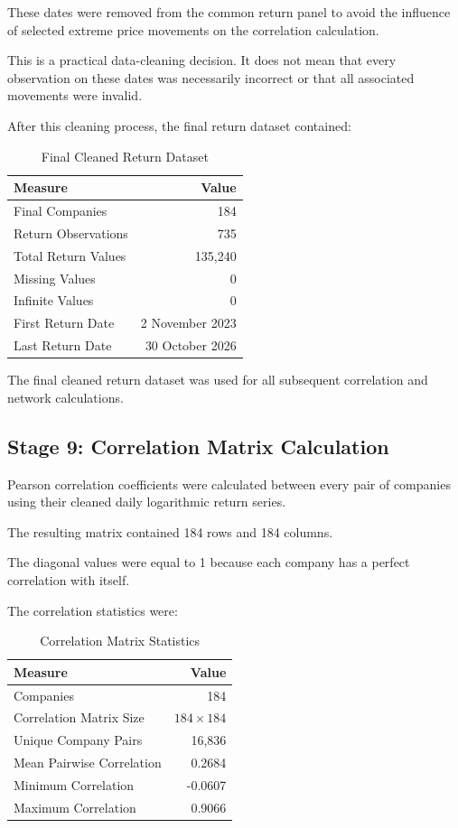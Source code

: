 \documentclass[11pt,a4paper]{article}
\begin{document}
These dates were removed from the common return panel to
avoid the influence of selected extreme price movements
on the correlation calculation.

This is a practical data-cleaning decision. It does not
mean that every observation on these dates was necessarily
incorrect or that all associated movements were invalid.

After this cleaning process, the final return dataset
contained:

\begin{table}[H]
\centering
\caption{Final Cleaned Return Dataset}
\label{tab:final_returns}
\begin{tabular}{lr}
\toprule
\textbf{Measure} & \textbf{Value}\\
\midrule
Final Companies & 184\\
Return Observations & 735\\
Total Return Values & 135,240\\
Missing Values & 0\\
Infinite Values & 0\\
First Return Date & 2 November 2023\\
Last Return Date & 30 October 2026\\
\bottomrule
\end{tabular}
\end{table}

The final cleaned return dataset was used for all subsequent
correlation and network calculations.

\subsection{Stage 9: Correlation Matrix Calculation}

Pearson correlation coefficients were calculated between
every pair of companies using their cleaned daily logarithmic
return series.

The resulting matrix contained 184 rows and 184 columns.

The diagonal values were equal to 1 because each company
has a perfect correlation with itself.

The correlation statistics were:

\begin{table}[H]
\centering
\caption{Correlation Matrix Statistics}
\label{tab:corr_statistics}
\begin{tabular}{lr}
\toprule
\textbf{Measure} & \textbf{Value}\\
\midrule
Companies & 184\\
Correlation Matrix Size & $184 \times 184$\\
Unique Company Pairs & 16,836\\
Mean Pairwise Correlation & 0.2684\\
Minimum Correlation & -0.0607\\
Maximum Correlation & 0.9066\\
\bottomrule
\end{tabular}
\end{table}
\end{document}
